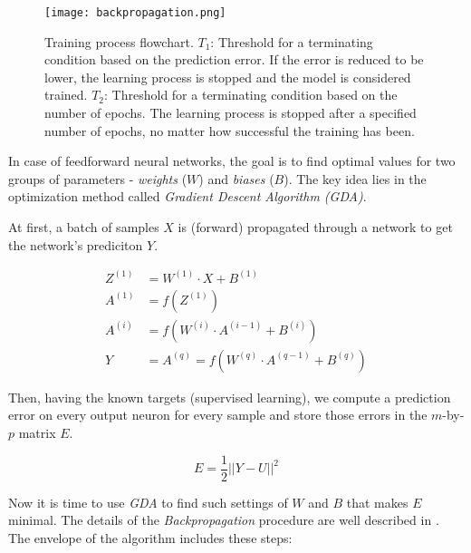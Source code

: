 \begin{figure}[H]
  \centering
  \texttt{[image: backpropagation.png]}
  \caption{Training process flowchart. $ T_1 $: Threshold for a terminating condition based on the prediction error. If the error is reduced to be lower, the learning process is stopped and the model is considered trained. $ T_2 $: Threshold for a terminating condition based on the number of epochs. The learning process is stopped after a specified number of epochs, no matter how successful the training has been.}
  \label{fig:methods:backpropagation}
\end{figure}

In case of feedforward neural networks, the goal is to find optimal values for two groups of parameters - \textit{weights} ($ W $) and \textit{biases} ($ B $). The key idea lies in the optimization method called \textit{Gradient Descent Algorithm (GDA)}.

At first, a batch of samples $ X $ is (forward) propagated through a network to get the network's prediciton $ Y $.

\begin{align}
Z^{(1)} &= W^{(1)} \cdot X + B^{(1)} \\
A^{(1)} &= f(Z^{(1)}) \\
A^{(i)} &= f(W^{(i)} \cdot A^{(i-1)} + B^{(i)}) \\
Y &= A^{(q)} = f(W^{(q)} \cdot A^{(q-1)} + B^{(q)})
\end{align}

Then, having the known targets (supervised learning), we compute a prediction error on every output neuron for every sample and store those errors in the $ m $-by-$ p $ matrix $ E $.

\begin{equation} \label{eq:prediction_error}
E = \frac{1}{2} ||Y - U||^2
\end{equation}

Now it is time to use \textit{GDA} to find such settings of $ W $ and $ B $ that makes $ E $ minimal. The details of the \textit{Backpropagation} procedure are well described in \citep{online:nnanddl}. The envelope of the algorithm includes these steps:

